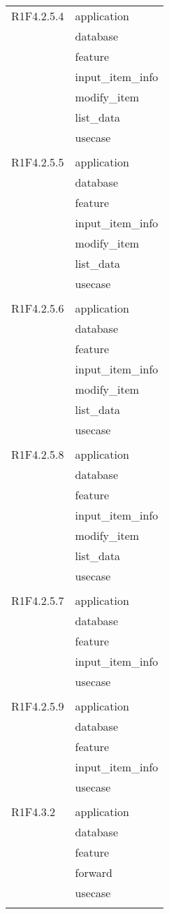 \begin{center}
\begin{longtable}{|p{7cm}|p{7cm}|}
		R1F4.2.5.4 & application \\ & database \\ & feature \\ & input\_item\_info \\ & modify\_item \\ & list\_data \\ & usecase \\ & \\ \hline
		R1F4.2.5.5 & application \\ & database \\ & feature \\ & input\_item\_info \\ & modify\_item \\ & list\_data \\ & usecase \\ & \\ \hline
		R1F4.2.5.6 & application \\ & database \\ & feature \\ & input\_item\_info \\ & modify\_item \\ & list\_data \\ & usecase \\ & \\ \hline
		R1F4.2.5.8 & application \\ & database \\ & feature \\ & input\_item\_info \\ & modify\_item \\ & list\_data \\ & usecase \\ & \\ \hline
		R1F4.2.5.7 & application \\ & database \\ & feature \\ & input\_item\_info \\ & usecase \\ & \\ \hline
		R1F4.2.5.9 & application \\ & database \\ & feature \\ & input\_item\_info \\ & usecase \\ & \\ \hline
		R1F4.3.2 & application \\ & database \\ & feature \\ & forward \\ & usecase \\ & \\ \hline

\end{longtable}
\end{center}
